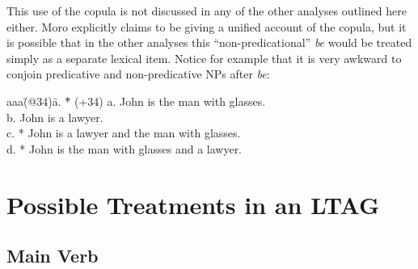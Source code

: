 This use of the copula is not discussed in any of the other analyses
outlined here either.  Moro explicitly claims to be giving a unified
account of the copula, but it is possible that in the other analyses
this ``non-predicational'' {\em be} would be treated simply as a
separate lexical item. Notice for example that it is very awkward to
conjoin predicative and non-predicative NPs after {\em be}:
\begin{tabbing}
aaa\=(@34)\= a. \= *\= \kill
   \>(+34)\> a. \>  \> John is the man with glasses. \\
   \>    \> b. \>  \> John is a lawyer. \\
   \>    \> c. \> *\> John is a lawyer and the man with glasses. \\
   \>    \> d. \> *\> John is the man with glasses and a lawyer.
\end{tabbing}

\section{Possible Treatments in an LTAG}
 
\subsection{Main Verb}

